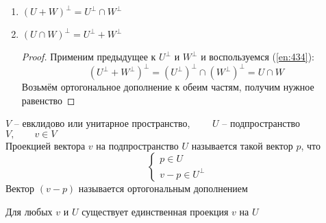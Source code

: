 \begin{properties}
\begin{enumerate}
\begin{proof}
			Следовательно, он ортогонален всем векторам из $ U $
		\end{proof}
		\item $ (U + W)^\perp = U^\perp \cap W^\perp $
		\item $ (U \cap W)^\perp = U^\perp + W^\perp $
		\begin{proof}
			Применим предыдущее к $ U^\perp $ и $ W^\perp $ и воспользуемся (\ref{en:434}):
			$$ (U^\perp + W^\perp)^\perp = (U^\perp)^\perp \cap (W^\perp)^\perp = U \cap W $$
			Возьмём ортогональное дополнение к обеим частям, получим нужное равенство
		\end{proof}
	\end{enumerate}
\end{properties}

\begin{definition}
	$ V $ -- евклидово или унитарное пространство, $ \qquad U $ -- подпространство $ V, \qquad v \in V $ \\
	Проекцией вектора $ v $ на подпространство $ U $ называется такой вектор $ p $, что
	$$
	\begin{cases}
		p \in U \\
		v - p \in U^\perp
	\end{cases} $$
	Вектор $ (v - p) $ называется ортогональным дополнением
\end{definition}

\begin{property}
	Для любых $ v $ и $ U $ существует единственная проекция $ v $ на $ U $
\end{property}

